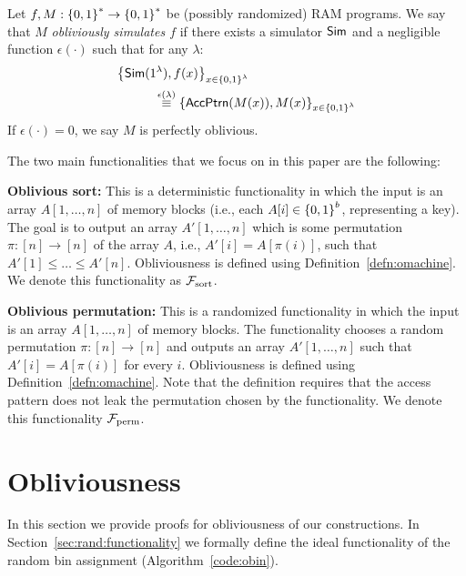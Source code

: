 \begin{definition}
\label{defn:omachine}
Let $f,M:{\{0,1\}}^* \rightarrow {\{0,1\}}^*$ be (possibly randomized) RAM programs. We say that $M$ {\em obliviously simulates $f$} if there exists a  simulator ${\sf Sim}$ and a negligible function $\epsilon(\cdot)$ such that  for any $\lambda$:%
\begin{eqnarray*}
\hspace{-5ex}\lefteqn{\left\{\Sim(1^\lambda),f(x)\right\}_{x \in \bit^\lambda}} \\
&&\hspace{+5ex}\overset{\epsilon(\lambda)}{\equiv} \left\{ {\sf AccPtrn}(M(x)),M(x)\right\}_{x \in \bit^\lambda}
\end{eqnarray*}
If $\epsilon(\cdot)=0$, we say $M$ is perfectly oblivious. 
\end{definition}

The two main functionalities that we focus on in this paper are the following:
\begin{MyItemize}
\item {\bf Oblivious sort:} This is a deterministic functionality in which the input is an array $A[1,\ldots,n]$ of memory blocks (i.e., each $A[i] \in {\{0,1\}}^{b}$, representing a key). The goal is to output an array $A'[1,\ldots,n]$ which is some permutation $\pi:[n] \rightarrow [n]$ of the array $A$, i.e., $A'[i] = A[\pi(i)]$, such that $A'[1]\leq \ldots \leq A'[n]$. Obliviousness is defined using Definition~\ref{defn:omachine}. We denote this functionality as ${\cal F}_{\rm sort}$. 

\item {\bf Oblivious permutation:} 
This is a randomized functionality in which the input is an array $A[1,\ldots,n]$ of memory blocks. The functionality chooses a random permutation $\pi:[n] \rightarrow [n]$ and outputs an array $A'[1,\ldots,n]$ such that $A'[i] = A[\pi(i)]$ for every $i$. Obliviousness is defined using Definition~\ref{defn:omachine}. Note that the definition requires that the access pattern does not leak the permutation chosen by the functionality. We denote this functionality ${\cal F}_{\rm perm}$. 
\end{MyItemize}


\section{Obliviousness}
\label{appx:formal}
In this section we provide proofs for obliviousness of our constructions. In Section~\ref{sec:rand:functionality} we formally define the ideal functionality of the random bin assignment (Algorithm~\ref{code:obin}). 


